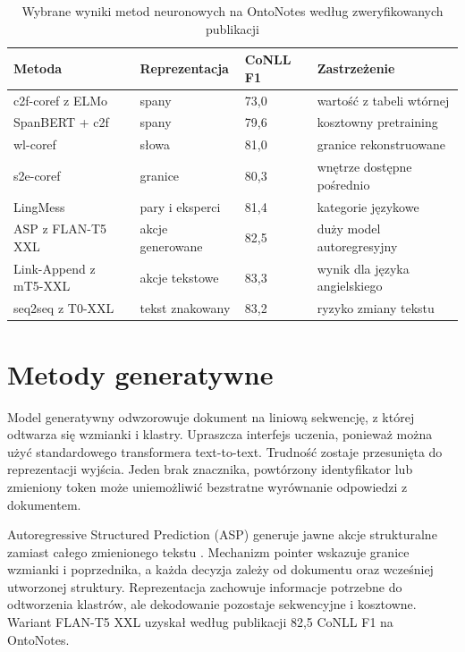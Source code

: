 \begin{table}[htbp]
  \centering
  \caption{Wybrane wyniki metod neuronowych na OntoNotes według zweryfikowanych publikacji}
  \label{tab:neuralne-coref}
  \begin{tabular}{p{}p{}p{}p{}}
    \toprule
    Metoda & Reprezentacja & CoNLL F1 & Zastrzeżenie \\
    \midrule
    c2f-coref z ELMo & spany & 73,0 & wartość z tabeli wtórnej \\
    SpanBERT + c2f & spany & 79,6 & kosztowny pretraining \\
    wl-coref & słowa & 81,0 & granice rekonstruowane \\
    s2e-coref & granice & 80,3 & wnętrze dostępne pośrednio \\
    LingMess & pary i eksperci & 81,4 & kategorie językowe \\
    ASP z FLAN-T5 XXL & akcje generowane & 82,5 & duży model autoregresyjny \\
    Link-Append z mT5-XXL & akcje tekstowe & 83,3 & wynik dla języka angielskiego \\
    seq2seq z T0-XXL & tekst znakowany & 83,2 & ryzyko zmiany tekstu \\
    \bottomrule
  \end{tabular}
\end{table}

\section{Metody generatywne}
\label{sec:metody-generatywne}

Model generatywny odwzorowuje dokument na liniową sekwencję, z której odtwarza się wzmianki i klastry. Upraszcza interfejs uczenia, ponieważ można użyć standardowego transformera text-to-text. Trudność zostaje przesunięta do reprezentacji wyjścia. Jeden brak znacznika, powtórzony identyfikator lub zmieniony token może uniemożliwić bezstratne wyrównanie odpowiedzi z dokumentem.

Autoregressive Structured Prediction (ASP) generuje jawne akcje strukturalne zamiast całego zmienionego tekstu \cite{liu_2022_asp}. Mechanizm pointer wskazuje granice wzmianki i poprzednika, a każda decyzja zależy od dokumentu oraz wcześniej utworzonej struktury. Reprezentacja zachowuje informacje potrzebne do odtworzenia klastrów, ale dekodowanie pozostaje sekwencyjne i kosztowne. Wariant FLAN-T5 XXL uzyskał według publikacji 82,5 CoNLL F1 na OntoNotes.

